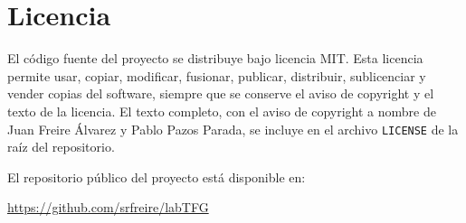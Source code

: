 \chapter{Licencia}
\label{ap:licencia}

El código fuente del proyecto se distribuye bajo licencia MIT. Esta licencia
permite usar, copiar, modificar, fusionar, publicar, distribuir, sublicenciar y
vender copias del software, siempre que se conserve el aviso de copyright y el
texto de la licencia. El texto completo, con el aviso de copyright a nombre de
Juan Freire Álvarez y Pablo Pazos Parada, se incluye en el archivo
\texttt{LICENSE} de la raíz del repositorio.

El repositorio público del proyecto está disponible en:

\begin{center}
\url{https://github.com/srfreire/labTFG}
\end{center}
